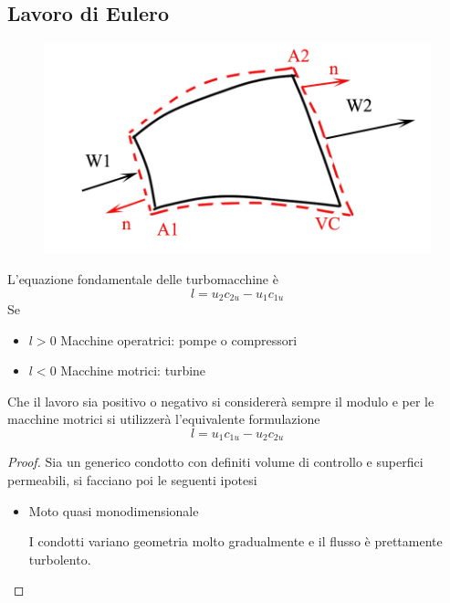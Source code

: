 \documentclass[a4paper, 15pt]{article}
\begin{document}
\subsection{Lavoro di Eulero} 
\begin{adjustwidth}{2in}{}
	\begin{figure}[H]
		\centering
		\includegraphics[width=0.5\linewidth]{immagini/eulero}
		\label{fig:eulero}
	\end{figure}
	L'equazione fondamentale delle turbomacchine è 
	\[l = u_2c_{2u} - u_1c_{1u}\]	
	Se 
	\begin{itemize}
		\item $l>0$ Macchine operatrici: pompe o compressori
		\item $l<0$ Macchine motrici: turbine
	\end{itemize}
	Che il lavoro sia positivo o negativo si considererà sempre il modulo e per le macchine motrici si utilizzerà l'equivalente formulazione 
	\[l = u_1c_{1u} - u_2c_{2u}\]	
	
	\begin{proof}
		Sia un generico condotto con definiti volume di controllo e superfici permeabili, si facciano poi le seguenti ipotesi
		\begin{itemize}
			\item Moto quasi monodimensionale 
			
			I condotti variano geometria molto gradualmente e il flusso è prettamente turbolento.
			

\end{itemize}
\end{proof}
\end{adjustwidth}
\end{document}
